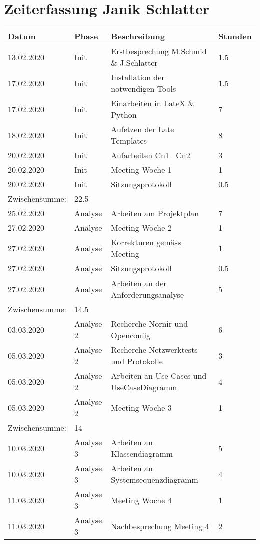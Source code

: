 \documentclass[
	ngerman,
	toc=listof, %
	toc=bibliography, %
	footnotes=multiple, %
	parskip=half, %
	numbers=noendperiod %
]{scrartcl}
\begin{document}
\section{Zeiterfassung Janik Schlatter}
	\begin{tabularx}{\textwidth}{llXl}
		\toprule
		Datum & Phase & Beschreibung & Stunden \\
		\midrule
		13.02.2020 & Init & Erstbesprechung M.Schmid \& J.Schlatter & 1.5 \\
		17.02.2020 & Init & Installation der notwendigen Tools & 1.5 \\
		17.02.2020 & Init & Einarbeiten in LateX \& Python & 7 \\
		18.02.2020 & Init & Aufetzen der Late Templates & 8 \\
		20.02.2020 & Init & Aufarbeiten Cn1 \ Cn2 & 3 \\
		20.02.2020 & Init & Meeting Woche 1 & 1 \\
		20.02.2020 & Init & Sitzungsprotokoll & 0.5 \\
		\midrule
		Zwischensumme: & 22.5 & & \\
		\midrule
		25.02.2020 & Analyse & Arbeiten am Projektplan & 7 \\
		27.02.2020 & Analyse & Meeting Woche 2 & 1 \\
		27.02.2020 & Analyse & Korrekturen gemäss Meeting & 1 \\
		27.02.2020 & Analyse & Sitzungsprotokoll & 0.5 \\
		27.02.2020 & Analyse & Arbeiten an der Anforderungsanalyse & 5 \\
		\midrule
		Zwischensumme: & 14.5 & & \\
		\midrule
		03.03.2020 & Analyse 2 & Recherche Nornir und Openconfig & 6 \\
		05.03.2020 & Analyse 2 & Recherche Netzwerktests und Protokolle & 3 \\
		05.03.2020 & Analyse 2 & Arbeiten an Use Cases und UseCaseDiagramm & 4 \\
		05.03.2020 & Analyse 2 & Meeting Woche 3 & 1 \\
		\midrule
		Zwischensumme: & 14 & & \\
		\midrule
		10.03.2020 & Analyse 3 & Arbeiten an Klassendiagramm & 5 \\
		10.03.2020 & Analyse 3 & Arbeiten an Systemsequenzdiagramm & 4 \\
		11.03.2020 & Analyse 3 & Meeting Woche 4 & 1 \\
		11.03.2020 & Analyse 3 & Nachbesprechung Meeting 4 & 2 \\

\end{tabularx}
\end{document}
